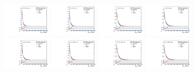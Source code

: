 \begin{figure}[htbp]
  \centering
  \includegraphics[width=0.21\textwidth]{fig/uncertainties/systs_nonRes_e_HP_bb_LDy_MVVScale_ProjX.pdf}
  \includegraphics[width=0.21\textwidth]{fig/uncertainties/systs_nonRes_e_LP_bb_LDy_MVVScale_ProjX.pdf}
  \includegraphics[width=0.21\textwidth]{fig/uncertainties/systs_nonRes_e_HP_bb_HDy_MVVScale_ProjX.pdf}
  \includegraphics[width=0.21\textwidth]{fig/uncertainties/systs_nonRes_e_LP_bb_HDy_MVVScale_ProjX.pdf}\\
  \includegraphics[width=0.21\textwidth]{fig/uncertainties/systs_nonRes_e_HP_nobb_LDy_MVVScale_ProjX.pdf}
  \includegraphics[width=0.21\textwidth]{fig/uncertainties/systs_nonRes_e_LP_nobb_LDy_MVVScale_ProjX.pdf}
  \includegraphics[width=0.21\textwidth]{fig/uncertainties/systs_nonRes_e_HP_nobb_HDy_MVVScale_ProjX.pdf}
  \includegraphics[width=0.21\textwidth]{fig/uncertainties/systs_nonRes_e_LP_nobb_HDy_MVVScale_ProjX.pdf}\\

\end{figure}

